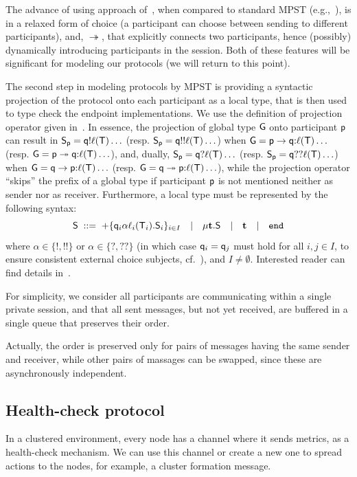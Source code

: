 The advance of using approach of~\cite{HuY17}, when compared to standard MPST (e.g.,~\cite{HondaYC08}),
is in a relaxed form of choice (a participant can choose between sending to different participants), 
and, $\twoheadrightarrow$, that explicitly connects two participants, hence (possibly) dynamically 
introducing participants in the session.
Both of these features will be significant for modeling our protocols (we will return to this point).

The second step in modeling protocols by MPST is providing a syntactic projection of the protocol onto each participant as a local type, that is then used to
type check the endpoint implementations.  
We use the definition of projection operator given in~\cite[Figure \ref{fig:fig2}]{HuY17}. 
In essence, the projection of global type ${\sf G}$ onto participant ${\sf p}$ can result in 
${\mathsf S}_{\sf p}={\sf q}{!}\ell({\mathsf T})\ldots$ (resp. ${\mathsf S}_{\sf p}={\sf q}{!!}\ell({\mathsf T})\ldots$) 
when ${\sf G}={\sf p}\to{\sf q}{:}\ell({\mathsf T})\ldots$ (resp. ${\sf G}={\sf p}\twoheadrightarrow{\sf q}{:}\ell({\mathsf T})\ldots$), 
and, dually, ${\mathsf S}_{\sf p}={\sf q}{?}\ell({\mathsf T})\ldots$ (resp. ${\mathsf S}_{\sf p}={\sf q}{??}\ell({\mathsf T})\ldots$) when ${\sf G}={\sf q}\to{\sf p}{:}\ell({\mathsf T})\ldots$ 
(resp. ${\sf G}={\sf q}\twoheadrightarrow{\sf p}{:}\ell({\mathsf T})\ldots$), 
while the projection operator ``skips'' the prefix of a global type if participant ${\sf p}$ is not mentioned neither as sender nor as receiver. Furthermore, a local type must be represented by the following syntax:\\
\[
{\mathsf S} \; ::= \; 
{+}\{{\sf q}_i\alpha\ell_i({\mathsf T}_i).{\mathsf S}_i\}_{i\in I}  \quad | \quad 
\mu \textbf{t}.{\mathsf S} \quad | \quad 
\textbf{t} \quad | \quad
\mathtt{end}
\]
where $\alpha\in\{{!}, {!!}\}$ or  $\alpha\in\{{?}, {??}\}$ (in which case ${\sf q}_i={\sf q}_j$ must hold for all $i,j \in I$, to ensure consistent external choice subjects, cf.~\cite[Page 6.]{HuY17}), and $I\not=\emptyset$.
Interested reader can find details in~\cite{HuY17}.

For simplicity, we consider all participants are communicating within a single private session, and that all sent messages, but not yet received, are buffered in a single queue that preserves their order. 

Actually, the order is preserved only for pairs of messages having the same sender and receiver, while other pairs of massages can be swapped, since these are asynchronously independent.
%
%
\subsection{Health-check protocol}\label{sec:health_check_protocol}
%
In a clustered environment, every node has a channel where it sends metrics, as a health-check mechanism. We can use this channel or create a new one to spread actions to the nodes, for example, a cluster formation message. 

